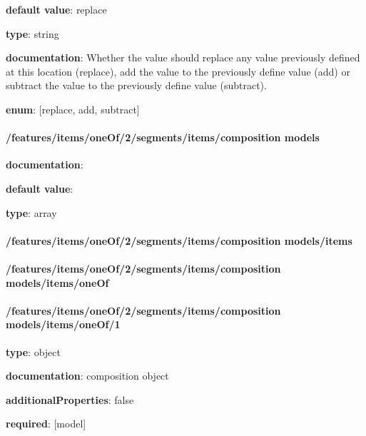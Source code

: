 \begin{itemized}
\item {\bf default value}: replace
\item {\bf type}: string
\item {\bf documentation}: Whether the value should replace any value previously defined at this location (replace), add the value to the previously define value (add) or subtract the value to the previously define value (subtract).
\item {\bf enum}: [replace, add, subtract]\end{itemized}\paragraph{/features/items/oneOf/2/segments/items/composition models} \begin{itemized}
\item {\bf documentation}: 
\item {\bf default value}: 
\item {\bf type}: array
\paragraph{/features/items/oneOf/2/segments/items/composition models/items} \begin{itemized}
\end{itemized}\end{itemized}\paragraph{/features/items/oneOf/2/segments/items/composition models/items/oneOf} \begin{itemized}
\end{itemized}\paragraph{/features/items/oneOf/2/segments/items/composition models/items/oneOf/1} \begin{itemized}
\item {\bf type}: object
\item {\bf documentation}: composition object
\item {\bf additionalProperties}: false
\item {\bf required}: [model]\end{itemized}
